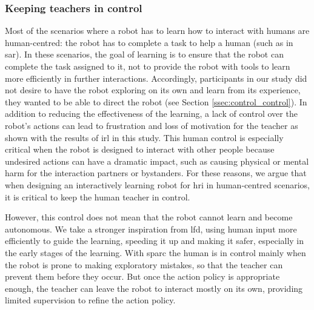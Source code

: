 \subsubsection{Keeping teachers in control}

Most of the scenarios where a robot has to learn how to interact with humans are human-centred: the robot has to complete a task to help a human (such as in \gls{sar}). In these scenarios, the goal of learning is to ensure that the robot can complete the task assigned to it, not to provide the robot with tools to learn more efficiently in further interactions. Accordingly, participants in our study did not desire to have the robot exploring on its own and learn from its experience, they wanted to be able to direct the robot (see Section \ref{ssec:control_control}). In addition to reducing the effectiveness of the learning, a lack of control over the robot's actions can lead to frustration and loss of motivation for the teacher as shown with the results of \gls{irl} in this study. This human control is especially critical when the robot is designed to interact with other people because undesired actions can have a dramatic impact, such as causing physical or mental harm for the interaction partners or bystanders. For these reasons, we argue that when designing an interactively learning robot for \gls{hri} in human-centred scenarios, it is critical to keep the human teacher in control. 

However, this control does not mean that the robot cannot learn and become autonomous. We take a stronger inspiration from \gls{lfd}, using human input more efficiently to guide the learning, speeding it up and making it safer, especially in the early stages of the learning. With \gls{sparc} the human is in control mainly when the robot is prone to making exploratory mistakes, so that the teacher can prevent them before they occur. But once the action policy is appropriate enough, the teacher can leave the robot to interact mostly on its own, providing limited supervision to refine the action policy.


